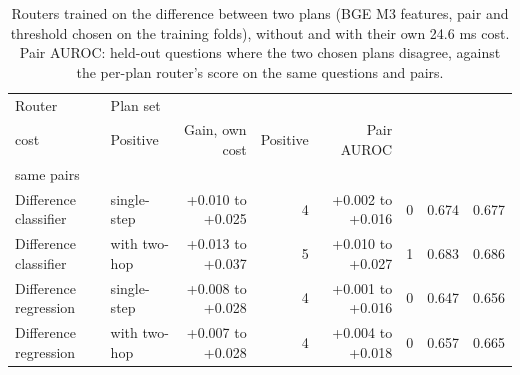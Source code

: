 \begin{table}[t]
\centering\small
\setlength{\tabcolsep}{4pt}
\caption{Routers trained on the difference between two plans (BGE M3 features, pair and threshold chosen on the training folds), without and with their own 24.6 ms cost. Pair AUROC: held-out questions where the two chosen plans disagree, against the per-plan router's score on the same questions and pairs.}
\label{tab:rev2_diff}
\begin{tabular*}{\linewidth}{@{\extracolsep{\fill}}llrrrrrr}
\toprule
Router & Plan set & \begin{tabular}[b]{@{}r@{}}Gain, no own \\ cost\end{tabular} & Positive & Gain, own cost & Positive  & Pair AUROC & \begin{tabular}[b]{@{}r@{}}Per-plan LR, \\ same pairs\end{tabular} \\
\midrule
Difference classifier & single-step & +0.010 to +0.025 & 4 & +0.002 to +0.016 & 0 & 0.674 & 0.677 \\
Difference classifier & with two-hop & +0.013 to +0.037 & 5 & +0.010 to +0.027 & 1 & 0.683 & 0.686 \\
Difference regression & single-step & +0.008 to +0.028 & 4 & +0.001 to +0.016 & 0 & 0.647 & 0.656 \\
Difference regression & with two-hop & +0.007 to +0.028 & 4 & +0.004 to +0.018 & 0 & 0.657 & 0.665 \\
\bottomrule
\end{tabular*}
\end{table}
